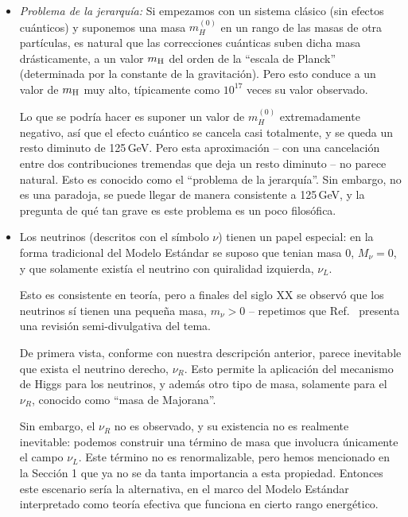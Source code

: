 \begin{itemize}

\item {\em Problema de la jerarqu\'ia:} Si empezamos con un sistema
cl\'asico (sin efectos cu\'anticos) y suponemos una masa $m_{H}^{(0)}$
en un rango de las masas de otra part\'iculas,
es natural que las correcciones cu\'anticas suben dicha masa
dr\'asticamente, a un valor $m_{\rm H}$ del orden de la ``escala de
Planck'' (determinada por la constante de la gravitaci\'on).
Pero esto conduce a un valor de $m_{\rm H}$ muy alto, t\'ipicamente
como $10^{17}$ veces su valor observado.

Lo que se podr\'ia hacer es suponer un valor de $m_{H}^{(0)}$
extremadamente negativo, as\'i que el efecto cu\'antico
se cancela casi totalmente, y se queda un resto diminuto
de 125\,GeV. Pero esta aproximaci\'on -- con una cancelaci\'on
entre dos contribuciones tremendas que deja un resto diminuto --
no parece natural. Esto es conocido como el ``problema de la
jerarqu\'ia''. Sin embargo, no es una paradoja, se puede llegar
de manera consistente a 125\,GeV, y la pregunta de qu\'e tan
grave es este problema es un poco filos\'ofica.

\item Los neutrinos (descritos con el s\'imbolo $\nu$) tienen
un papel especial: en la forma tradicional del Modelo
Est\'andar se suposo que tenian masa 0, $M_{\nu} =0$,
y que solamente exist\'ia el neutrino con quiralidad izquierda,
$\nu_L$.

Esto es consistente en teor\'ia, pero a finales del siglo XX
se observ\'o que los neutrinos s\'i tienen una peque\~na  masa,
$m_{\nu}>0$ -- repetimos que Ref.\ \cite{neutrinos} presenta una
revisi\'on semi-divulgativa del tema.

De primera vista, conforme con nuestra descripci\'on anterior,
parece inevitable que exista el neutrino derecho, $\nu_R$.  
Esto permite la aplicaci\'on del mecanismo de Higgs para los
neutrinos, y adem\'as otro tipo de masa, solamente para el
$\nu_R$, conocido como ``masa de Majorana''.

Sin embargo, el $\nu_R$ no es observado, y su existencia no
es realmente inevitable: podemos construir una t\'ermino de masa
que involucra \'unicamente el campo $\nu_L$. Este t\'ermino no
es renormalizable, pero hemos mencionado en la Secci\'on 1 que ya no
se da tanta importancia a esta propiedad. Entonces este escenario
ser\'ia la alternativa, en el marco del Modelo Est\'andar interpretado
como teor\'ia efectiva que funciona en cierto rango energ\'etico.


\end{itemize}
